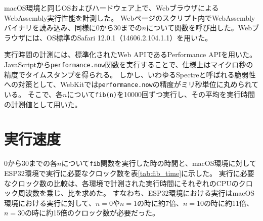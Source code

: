 macOS環境と同じOSおよびハードウェア上で、WebブラウザによるWebAssembly実行性能を計測した。
Webページのスクリプト内でWebAssemblyバイナリを読み込み、同様に0から30までの$n$について関数を呼び出した。Webブラウザには、OS標準のSafari 12.0.1（14606.2.104.1.1）を用いた。

実行時間の計測には、標準化されたWeb APIであるPerformance APIを用いた。
JavaScriptから\verb|performance.now|関数を実行することで、仕様上はマイクロ秒の精度でタイムスタンプを得られる。
しかし、いわゆるSpectreと呼ばれる脆弱性への対策として、WebKitでは\verb|performance.now|の精度がミリ秒単位に丸められている\cite{webkit_spectre}\cite{webkit_trac}。
そこで、各$n$について\verb|fib(n)|を10000回ずつ実行し、その平均を実行時間の計測値として用いた。

\section{実行速度}

0から30までの各$n$について\verb|fib|関数を実行した時の時間と、macOS環境に対してESP32環境で実行に必要なクロック数を表\ref{tab:fib_time}に示した。
実行に必要なクロック数の比較は、各環境で計測された実行時間にそれぞれのCPUのクロック周波数を乗じ、比を求めた。
すなわち、ESP32環境における実行はmacOS環境における実行に対して、$n=0$や$n=1$の時に約7倍、$n=10$の時に約11倍、$n=30$の時に約15倍のクロック数が必要だった。

